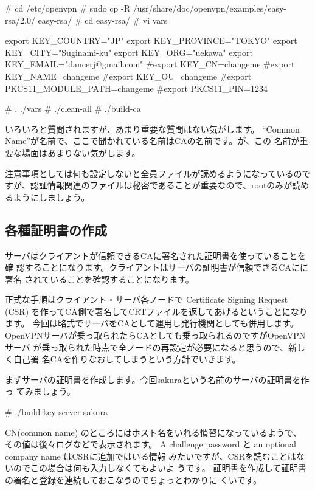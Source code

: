 \documentclass[mingoth,a4paper]{jsarticle}
\begin{document}
\begin{commandline}
 # cd /etc/openvpn
 # sudo cp -R /usr/share/doc/openvpn/examples/easy-rsa/2.0/ easy-rsa/
 # cd easy-rsa/
 # vi vars

export KEY_COUNTRY="JP"
export KEY_PROVINCE="TOKYO"
export KEY_CITY="Suginami-ku"
export KEY_ORG="uekawa"
export KEY_EMAIL="dancerj@gmail.com"
#export KEY_CN=changeme
#export KEY_NAME=changeme
#export KEY_OU=changeme
#export PKCS11_MODULE_PATH=changeme
#export PKCS11_PIN=1234

 # . ./vars
 # ./clean-all
 # ./build-ca

\end{commandline}

いろいろと質問されますが、あまり重要な質問はない気がします。
``Common Name''が名前で、ここで聞かれている名前はCAの名前です。が、この
名前が重要な場面はあまりない気がします。

注意事項としては何も設定しないと全員ファイルが読めるようになっているので
すが、認証情報関連のファイルは秘密であることが重要なので、rootのみが読め
るようにしましょう。

\subsection{各種証明書の作成}

サーバはクライアントが信頼できるCAに署名された証明書を使っていることを確
認することになります。クライアントはサーバの証明書が信頼できるCAにに署名
されていることを確認することになります。

正式な手順はクライアント・サーバ各ノードで Certificate Signing Request
(CSR) を作ってCA側で署名してCRTファイルを返してあげるということになります。
今回は略式でサーバをCAとして運用し発行機関としても併用します。
OpenVPNサーバが乗っ取られたらCAとしても乗っ取られるのですがOpenVPNサーバ
が乗っ取られた時点で全ノードの再設定が必要になると思うので、新しく自己署
名CAを作りなおしてしまうという方針でいきます。

まずサーバの証明書を作成します。今回sakuraという名前のサーバの証明書を作っ
てみましょう。

\begin{commandline}
 # ./build-key-server sakura
\end{commandline}

CN(common name) のところにはホスト名をいれる慣習になっているようで、
その値は後々ログなどで表示されます。
A challenge password と an optional company name はCSRに追加ではいる情報
みたいですが、CSRを読むことはないのでこの場合は何も入力しなくてもよいよ
うです。
証明書を作成して証明書の署名と登録を連続しておこなうのでちょっとわかりに
くいです。
\end{document}
